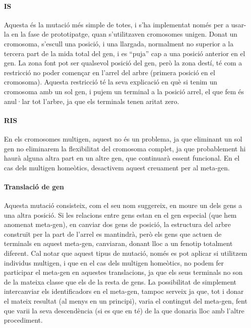 \paragraph{IS} %
\label{par:IS}
Aquesta és la mutació més simple de totes, i s'ha implementat només per a
usar-la en la fase de prototipatge, quan s'utilitzaven cromosomes unigen.  Donat
un cromosoma, s'escull una posició, i una llargada, normalment no superior a la
tercera part de la mida total del gen, i es ``puja'' cap a una posició anterior
en el gen.  La zona font pot ser qualsevol posició del gen, però la zona destí,
té com a restricció no poder començar en l'arrel del arbre (primera posició en
el cromosoma).  Aquesta restricció té la seva explicació en què si tenim un
cromosoma amb un sol gen, i pujem un terminal a la posició arrel, el que fem és
anul·lar tot l'arbre, ja que els terminals tenen aritat zero.


\paragraph{RIS} %
\label{par:RIS}
En els cromosomes multigen, aquest no és un problema, ja que eliminant un sol
gen no eliminarem la flexibilitat del cromosoma complet, ja que probablement hi
haurà alguna altra part en un altre gen, que continuarà essent funcional.  En el
cas dels multigen homeòtics, desactivem aquest creuament per al meta-gen.

\paragraph{Translació de gen} %
\label{par:Translacio de gen}

Aquesta mutació consisteix, com el seu nom suggereix, en moure un dels gens a una
altra posició.  Si les relacions entre gens estan en el gen especial (que hem
anomenat meta-gen), en canviar dos gens de posició, la estructura del arbre
construït per la part de l'arrel es mantindrà, però els gens que actuen de
terminals en aquest meta-gen, canviaran, donant lloc a un fenotip totalment
diferent.  Cal notar que aquest tipus de mutació, només es pot aplicar si
utilitzem individus multigen, i que en el cas dels multigen homeòtics, no podem
fer participar el meta-gen en aquestes translacions, ja que els seus terminals no
son de la mateixa classe que els de la resta de gens.  La possibilitat de
simplement intercanviar els identificadors en el meta-gen, tampoc serveix ja
que, tot i donar el mateix resultat (al menys en un principi), varia el
contingut del meta-gen, fent que varii la seva descendència (si es que en té) de
la que donaria lloc amb l'altre procediment.

